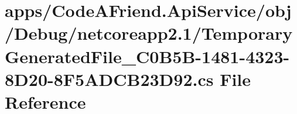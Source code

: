 \hypertarget{apps_2_code_a_friend_8_api_service_2obj_2_debug_2netcoreapp2_81_2_temporary_generated_file__036_2b59caef4950f2e85a167a96fb2eb3e1}{}\section{apps/\+Code\+A\+Friend.Api\+Service/obj/\+Debug/netcoreapp2.1/\+Temporary\+Generated\+File\+\_\+C0\+B5\+B-\/1481-\/4323-\/8\+D20-\/8\+F5\+A\+D\+C\+B23\+D92.cs File Reference}
\label{apps_2_code_a_friend_8_api_service_2obj_2_debug_2netcoreapp2_81_2_temporary_generated_file__036_2b59caef4950f2e85a167a96fb2eb3e1}
